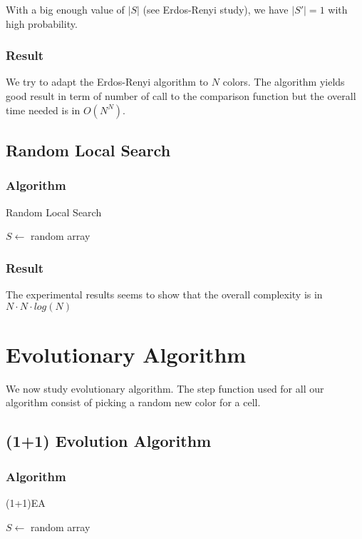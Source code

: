 \documentclass[12pt]{article}
\theoremstyle{definition}
\theoremstyle{plain}
\theoremstyle{remark}
\begin{document}
With a big enough value of $|S|$ (see Erdos-Renyi study), we have $|S'| = 1$ with high probability.

\subsubsection{Result}


We try to adapt the Erdos-Renyi algorithm to $N$ colors.
The algorithm yields good result in term of number of call to the comparison function but the overall time needed is in $O(N^N)$.

\subsection{Random Local Search}
\subsubsection{Algorithm}
\begin{algorithm}[H]
	\caption{Random Local Search}
	$S \leftarrow$ random array
\end{algorithm}
\subsubsection{Result}


The experimental results seems to show that the overall complexity is in $N \cdot N \cdot log(N)$

\section{Evolutionary Algorithm}
We now study evolutionary algorithm.
The step function used for all our algorithm consist of picking a random new color for a cell.
\subsection{(1+1) Evolution Algorithm}
\subsubsection{Algorithm}
\begin{algorithm}[H]
	\caption{(1+1)EA}
	$S \leftarrow$ random array\\
\end{algorithm}
\end{document}
